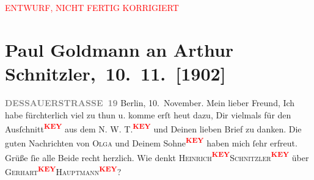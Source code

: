 
\begin{center}
            \textcolor{red}{ENTWURF, NICHT FERTIG KORRIGIERT}
                      \end{center}
            
         
         \renewcommand{\erwaehntePersonen}{Personen: Otto Brahm, Olga Schnitzler}
         \renewcommand{\erwaehnteOrte}{Orte: Berlin, Dessauer Straße, Wien}
         \renewcommand{\erwaehnteWerke}{}
               \section[ Paul Goldmann an Arthur Schnitzler, 10. 11. {[}1902{]}]{ Paul Goldmann an Arthur Schnitzler, 10. 11. {[}1902{]}}\nopagebreak{}\rehead{ }\begin{ledgroupsized}[t]{13cm}\normalsize\beginnumbering \toendnotes[C]{\smallbreak\pagebreak[2]} 
\toendnotes[C]{\smallbreak}\pstart
           \noindent{}\raggedleft{}{\pb}\textcolor{gray}{\textbf{DESSAUERSTRASSE 19}}\pend
           \pstart
           Berlin, 10. November.\pend
           \pstart\center{}Mein lieber Freund,\pend\pstart
           Ich habe fürchterlich viel zu thun u. komme erſt heut dazu, Dir
                    vielmals für den Ausſchnitt\textcolor{red}{\textsuperscript{\textbf{KEY}}} aus dem N. W. T.\textcolor{red}{\textsuperscript{\textbf{KEY}}} und Deinen lieben Brief zu danken. \pend
           \pstart
           Die guten Nachrichten von \textsc{Olga} und Deinem Sohne\textcolor{red}{\textsuperscript{\textbf{KEY}}} haben mich ſehr erfreut.
                    Grüße ſie alle Beide recht herzlich. Wie denkt \textsc{Heinrich\textcolor{red}{\textsuperscript{\textbf{KEY}}}}\textsc{Schnitzler\textcolor{red}{\textsuperscript{\textbf{KEY}}}} über \textsc{Gerhart\textcolor{red}{\textsuperscript{\textbf{KEY}}}}\textsc{Hauptmann\textcolor{red}{\textsuperscript{\textbf{KEY}}}}? \pend
           \pstart

\end{ledgroupsized}
